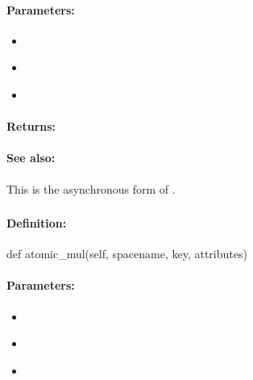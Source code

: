 \paragraph{Parameters:}
\begin{itemize}[noitemsep]
\item {}\\

\item {}\\

\item {}\\

\end{itemize}

\paragraph{Returns:}


\paragraph{See also:}  This is the asynchronous form of .

\pagebreak
\subsubsection{}
\label{api:python:atomic_mul}


\paragraph{Definition:}
\begin{pythoncode}
def atomic_mul(self, spacename, key, attributes)
\end{pythoncode}

\paragraph{Parameters:}
\begin{itemize}[noitemsep]
\item {}\\

\item {}\\

\item {}\\

\end{itemize}

